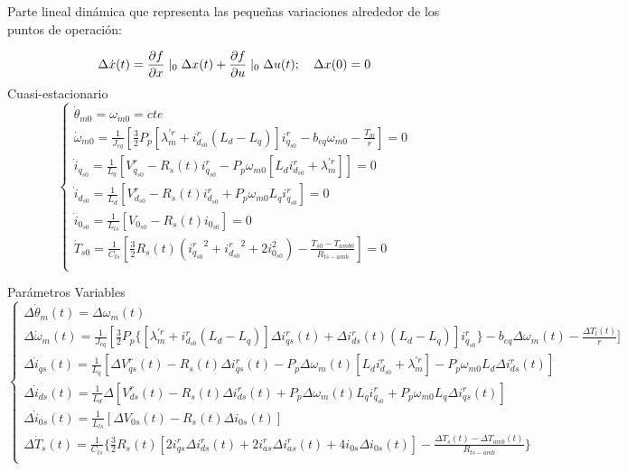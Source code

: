 \documentclass{article}
\begin{document}
Parte lineal dinámica que representa las pequeñas variaciones alrededor de los puntos de operación:

\begin{equation}
    \Delta\dot{x}(t) = \frac{\partial f}{\partial x}\mid_{0}\Delta x(t) + \frac{\partial f}{\partial u}\mid_{0}\Delta u(t); \quad \Delta x(0) = 0\\
\end{equation}
Cuasi-estacionario
\begin{equation}
    \begin{cases}
        \dot{\theta}_{m0} = \omega_{m0} = cte\\
        \dot{\omega}_{m0} = \frac{1}{J_{eq}}[\frac{3}{2}P_{p}[\lambda_{m}^{\prime r}+i_{d_{s0}}^r(L_{d}-L_{q})]i_{q_{s0}}^r - b_{eq}\omega_{m0} - \frac{T_{l0}}{r}] = 0\\
        \dot{i}_{q_{s0}} = \frac{1}{L_{q}}[V_{q_{s0}}^r - R_{s}(t)i_{q_{s0}}^r - P_{p}\omega_{m0}[L_{d}i_{d_{s0}}^r+\lambda_{m}^{\prime r}]] = 0\\
        \dot{i}_{d_{s0}} = \frac{1}{L_{d}}[V_{d_{s0}}^r - R_{s}(t)i_{d_{s0}}^r + P_{p}\omega_{m0}L_{q}i_{q_{s0}}^r] = 0 \\
        \dot{i}_{0_{s0}} = \frac{1}{L_{ls}}[V_{0_{s0}} - R_{s}(t)i_{0_{s0}}] = 0\\
        \dot{T}_{s0} = \frac{1}{C_{ts}}[\frac{3}{2}R_{s}(t)({i_{q_{s0}}^r}^2+{i_{d_{s0}}^r}^2+2i_{0_{s0}}^2)-\frac{T_{s0}-T_{amb0}}{R_{ts-amb}}] = 0\\
    \end{cases}
\end{equation}

Parámetros Variables
\begin{equation}
    \begin{cases}
        \Delta\dot{\theta}_{m}(t) = \Delta\omega_{m}(t)\\
        \Delta\dot{\omega}_{m}(t) = \frac{1}{J_{eq}}[\frac{3}{2}P_{p}\{[\lambda_{m}^{\prime r} + i_{d_{s0}}^r(L_{d}-L_{q})]\Delta i_{qs}^r(t) + \Delta i_{ds}^r(t)(L_{d}-L_{q})]i_{q_{s0}}^r\}- b_{eq}\Delta\omega_{m}(t) - \frac{\Delta T_{l}(t)}{r}]\\
        \Delta\dot{i}_{qs}(t) = \frac{1}{L_{q}}[\Delta V_{qs}^r(t) - R_{s}(t)\Delta i_{qs}^r(t) - P_{p}\Delta\omega_{m}(t)[L_{d}i_{d_{s0}}^r+\lambda_{m}^{\prime r}] - P_{p}\omega_{m0}L_{d}\Delta i_{ds}^r(t)] \\
        \Delta\dot{i}_{ds}(t) = \frac{1}{L_{d}}\Delta [V_{ds}^r(t) - R_{s}(t)\Delta i_{ds}^r(t) + P_{p}\Delta\omega_{m}(t)L_{q}i_{q_{s0}}^r + P_{p}\omega_{m0}L_{q}\Delta i_{qs}^r(t)]  \\
        \Delta\dot{i}_{0s}(t) = \frac{1}{L_{ls}}[\Delta V_{0s}(t) - R_{s}(t)\Delta i_{0s}(t)] \\
        \Delta\dot{T}_{s}(t) = \frac{1}{C_{ts}}\{\frac{3}{2}R_{s}(t)[{2i_{qs}^r\Delta i_{ds}^r(t)} + 2i_{as}^r\Delta i_{as}^r(t)+4i_{0s}\Delta i_{0s}(t)]-\frac{\Delta T_{s}(t)-\Delta T_{amb}(t)}{R_{ts-amb}}\}\\
    \end{cases}
\end{equation}
\end{document}

